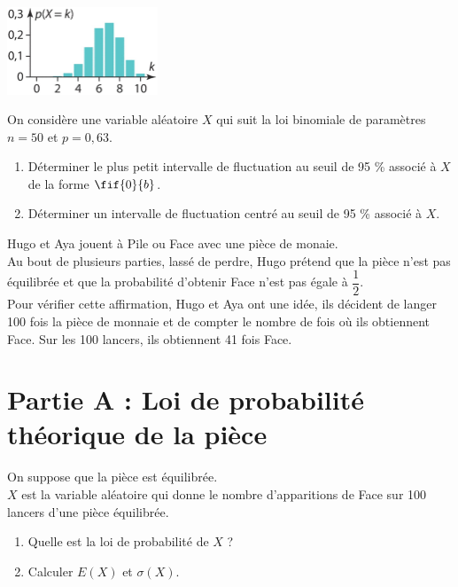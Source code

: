 \documentclass[a4paper,11pt,exos]{nsi} %
\begin{document}
\exo{}
{\includegraphics[width=4.5cm]{diagramme2.jpg}}


\exo{}
On considère une variable aléatoire $X$ qui suit la loi binomiale de paramètres $n=50$ et $p=0,63$.
\begin{enumerate}
    \item Déterminer le plus petit intervalle de fluctuation au seuil de 95 \% associé à $X$ de la forme $\fif{0}{b}$.
    \item Déterminer un intervalle de fluctuation centré au seuil de 95 \% associé à $X$.
\end{enumerate}

Hugo et Aya jouent à Pile ou Face avec une pièce de monaie.\\
Au bout de plusieurs parties, lassé de perdre, Hugo prétend que la pièce n'est pas équilibrée et que la probabilité d'obtenir Face n'est pas égale à $\dfrac{1}{2}$.\\[.5em]
Pour vérifier cette affirmation, Hugo et Aya ont une idée, ils décident de langer 100 fois la pièce de monnaie et de compter le nombre de fois où ils obtiennent Face. Sur les 100 lancers, ils obtiennent 41 fois Face.

\section*{Partie A : Loi de probabilité théorique de la pièce}
On suppose que la pièce est équilibrée.\\
$X$ est la variable aléatoire qui donne le nombre d'apparitions de Face sur 100 lancers d'une pièce équilibrée.
\begin{enumerate}
    \item Quelle est la loi de probabilité de $X$ ?
    \item Calculer $E(X)$ et $\sigma(X)$.
\end{enumerate}
\end{document}
